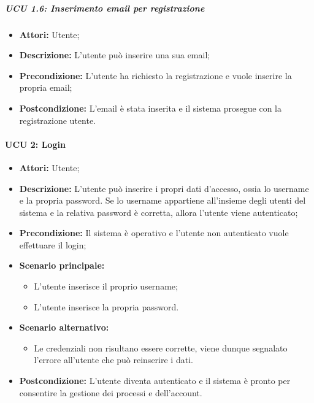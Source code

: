 \iffalse %
\subparagraph{UCU 1.6: Inserimento numero di telefono per registrazione}
\begin{itemize}
	\item \textbf{Attori:} Utente;
	\item \textbf{Descrizione:} L'utente può inserire il proprio numero di telefono;
	\item \textbf{Precondizione:} L'utente ha richiesto la registrazione e vuole inserire il proprio numero di telefono;
	\item \textbf{Postcondizione:} Il numero di telefono è stato inserito e il sistema prosegue con la registrazione utente.
\end{itemize}
\fi

\subparagraph{UCU 1.6: Inserimento email per registrazione}
\begin{itemize}
	\item \textbf{Attori:} Utente;
	\item \textbf{Descrizione:} L'utente può inserire una sua email;
	\item \textbf{Precondizione:} L'utente ha richiesto la registrazione e vuole inserire la propria email;
\item \textbf{Postcondizione:} L'email è stata inserita e il sistema prosegue con la registrazione utente.
\end{itemize}

\paragraph{UCU 2: Login}
\begin{itemize}
\item \textbf{Attori:} Utente;
\item \textbf{Descrizione:} L'utente può inserire i propri dati d'accesso, ossia lo username e la propria password. Se lo username appartiene all'insieme degli utenti del sistema e la relativa password è corretta, allora l'utente viene autenticato;
\item \textbf{Precondizione:} Il sistema è operativo e l'utente non autenticato vuole effettuare il login;
\item \textbf{Scenario principale:}
\begin{itemize}
\item L'utente inserisce il proprio username;
\item L'utente inserisce la propria password.
\end{itemize}
\item \textbf{Scenario alternativo:}
\begin{itemize}
\item Le credenziali non risultano essere corrette, viene dunque segnalato l'errore all'utente che può reinserire i dati.
\end{itemize}
\item \textbf{Postcondizione:} L'utente diventa autenticato e il sistema è pronto per consentire la gestione dei processi e dell'account.
\end{itemize}

